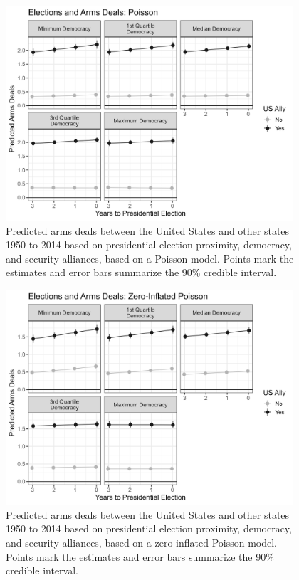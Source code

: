 \documentclass[12pt]{article}
\begin{document}
\begin{figure}[htpb]
	\centering
		\includegraphics[width=0.95\textwidth]{deals-pred-pois.png}
	\caption{Predicted arms deals between the United States and other states 1950 to 2014 based on presidential election proximity, democracy, and security alliances, based on a Poisson model. Points mark the estimates and error bars summarize the 90\% credible interval.}
	\label{fig:deals-pred-pois}
\end{figure}



\begin{figure}[htpb]
	\centering
		\includegraphics[width=0.95\textwidth]{deals-pred-zip.png}
	\caption{{Predicted arms deals between the United States and other states 1950 to 2014 based on presidential election proximity, democracy, and security alliances, based on a zero-inflated Poisson model. Points mark the estimates and error bars summarize the 90\% credible interval.}}
	\label{fig:deals-pred-zip}
\end{figure}
\end{document}
